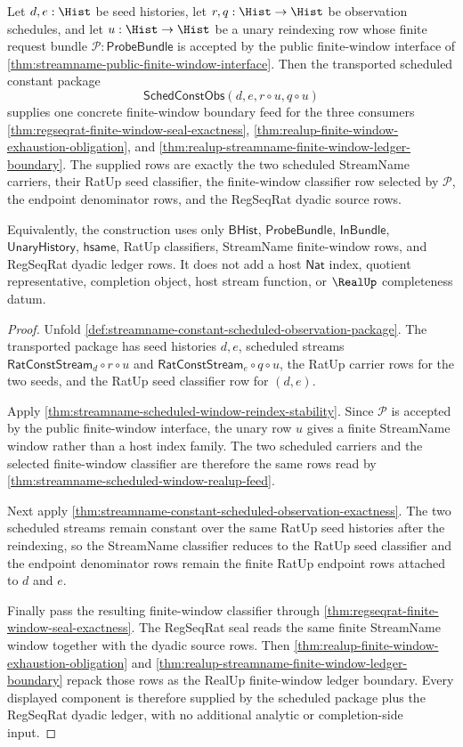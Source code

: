 \begin{theorem}
\label{thm:streamname-regseqrat-realup-finite-window-feed}
Let $d,e:\Hist$ be seed histories, let $r,q:\Hist\to\Hist$ be observation
schedules, and let $u:\Hist\to\Hist$ be a unary reindexing row whose finite
request bundle $\mathcal{P}:\mathsf{ProbeBundle}$ is accepted by the public
finite-window interface of
\autoref{thm:streamname-public-finite-window-interface}. Then the transported
scheduled constant package
$$
\mathsf{SchedConstObs}(d,e,r\circ u,q\circ u)
$$
supplies one concrete finite-window boundary feed for the three consumers
\autoref{thm:regseqrat-finite-window-seal-exactness},
\autoref{thm:realup-finite-window-exhaustion-obligation}, and
\autoref{thm:realup-streamname-finite-window-ledger-boundary}. The supplied
rows are exactly the two scheduled StreamName carriers, their RatUp seed
classifier, the finite-window classifier row selected by $\mathcal{P}$, the
endpoint denominator rows, and the RegSeqRat dyadic source rows.

Equivalently, the construction uses only $\mathsf{BHist}$,
$\mathsf{ProbeBundle}$, $\mathsf{InBundle}$, $\mathsf{UnaryHistory}$,
$\mathsf{hsame}$, RatUp classifiers, StreamName finite-window rows, and
RegSeqRat dyadic ledger rows. It does not add a host $\mathsf{Nat}$ index,
quotient representative, completion object, host stream function, or
$\RealUp$ completeness datum.
\end{theorem}
\begin{proof}
Unfold \autoref{def:streamname-constant-scheduled-observation-package}. The
transported package has seed histories $d,e$, scheduled streams
$\mathsf{RatConstStream}_d\circ r\circ u$ and
$\mathsf{RatConstStream}_e\circ q\circ u$, the RatUp carrier rows for the two
seeds, and the RatUp seed classifier row for $(d,e)$.

Apply \autoref{thm:streamname-scheduled-window-reindex-stability}. Since
$\mathcal{P}$ is accepted by the public finite-window interface, the unary row
$u$ gives a finite StreamName window rather than a host index family. The two
scheduled carriers and the selected finite-window classifier are therefore
the same rows read by
\autoref{thm:streamname-scheduled-window-realup-feed}.

Next apply
\autoref{thm:streamname-constant-scheduled-observation-exactness}. The two
scheduled streams remain constant over the same RatUp seed histories after
the reindexing, so the StreamName classifier reduces to the RatUp seed
classifier and the endpoint denominator rows remain the finite RatUp endpoint
rows attached to $d$ and $e$.

Finally pass the resulting finite-window classifier through
\autoref{thm:regseqrat-finite-window-seal-exactness}. The RegSeqRat seal reads
the same finite StreamName window together with the dyadic source rows. Then
\autoref{thm:realup-finite-window-exhaustion-obligation} and
\autoref{thm:realup-streamname-finite-window-ledger-boundary} repack those
rows as the RealUp finite-window ledger boundary. Every displayed component is
therefore supplied by the scheduled package plus the RegSeqRat dyadic ledger,
with no additional analytic or completion-side input.
\end{proof}

